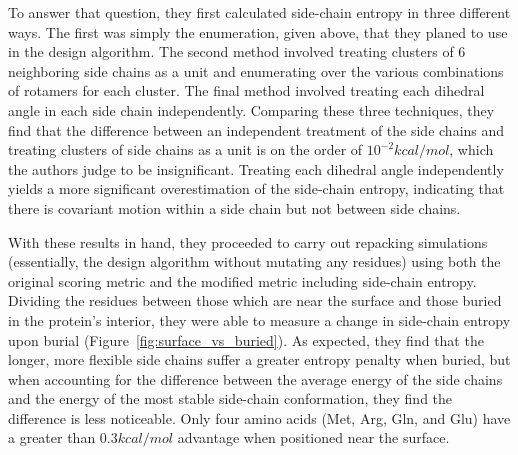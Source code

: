 To answer that question, they first calculated side-chain entropy in three different ways. The first was simply the enumeration, given above, that they planed to use in the design algorithm. The second method involved treating clusters of 6 neighboring side chains as a unit and enumerating over the various combinations of rotamers for each cluster. The final method involved treating each dihedral angle in each side chain independently. Comparing these three techniques, they find that the difference between an independent treatment of the side chains and treating clusters of side chains as a unit is on the order of $10^{-2} kcal/mol$, which the authors judge to be insignificant. Treating each dihedral angle independently yields a more significant overestimation of the side-chain entropy, indicating that there is covariant motion within a side chain but not between side chains.

With these results in hand, they proceeded to carry out repacking simulations (essentially, the design algorithm without mutating any residues) using both the original scoring metric and the modified metric including side-chain entropy. Dividing the residues between those which are near the surface and those buried in the protein's interior, they were able to measure a change in side-chain entropy upon burial (Figure~\ref{fig:surface_vs_buried}). As expected, they find that the longer, more flexible side chains suffer a greater entropy penalty when buried, but when accounting for the difference between the average energy of the side chains and the energy of the most stable side-chain conformation, they find the difference is less noticeable. Only four amino acids (Met, Arg, Gln, and Glu) have a greater than $0.3 kcal/mol$ advantage when positioned near the surface.

